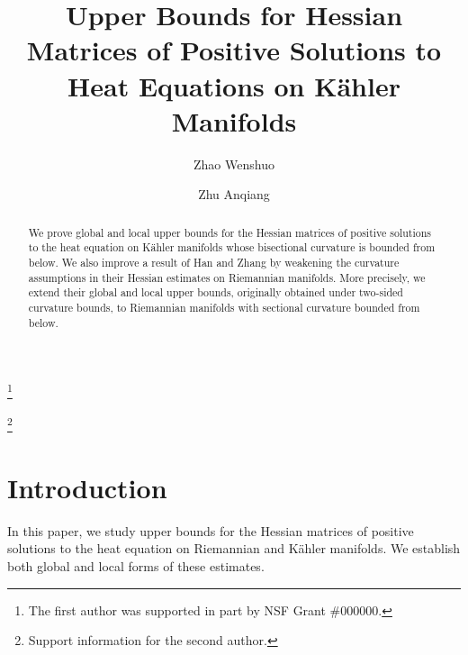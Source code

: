\documentclass{amsart}
\theoremstyle{definition}
\theoremstyle{remark}
\numberwithin{equation}{section}
\begin{document}
\title[Hessian Bounds for Heat Equations on K\"ahler Manifolds]
{Upper Bounds for Hessian Matrices of Positive Solutions to Heat Equations on K\"ahler Manifolds}

\author{Zhao Wenshuo}
\address{School of Mathematics and Statistics, Wuhan University, Wuhan, Hubei Province, China}

\thanks{The first author was supported in part by NSF Grant \#000000.}

\author{Zhu Anqiang}
\address{School of Mathematics and Statistics, Wuhan University, Wuhan, Hubei Province, China}
\thanks{Support information for the second author.}


\date{}




\begin{abstract}
We prove global and local upper bounds for the Hessian matrices of positive solutions to the heat equation on K\"ahler manifolds whose bisectional curvature is bounded from below. We also improve a result of Han and Zhang by weakening the curvature assumptions in their Hessian estimates on Riemannian manifolds. More precisely, we extend their global and local upper bounds, originally obtained under two-sided curvature bounds, to Riemannian manifolds with sectional curvature bounded from below.
\end{abstract}

\maketitle


\section{Introduction}
\label{}

In this paper, we study upper bounds for the Hessian matrices of positive solutions to the heat equation on Riemannian and K\"ahler manifolds. We establish both global and local forms of these estimates.
\end{document}
